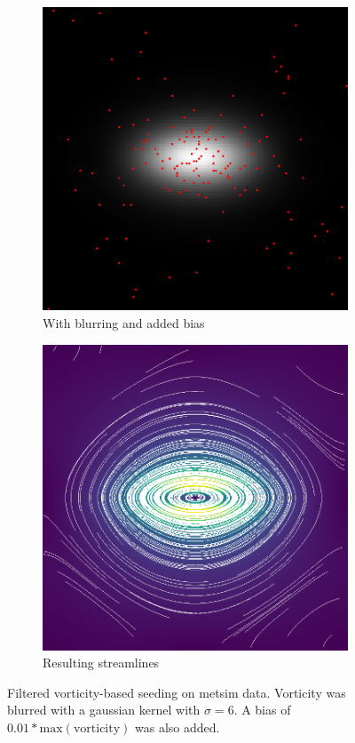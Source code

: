 \documentclass{article}
\begin{document}
\begin{figure}[h!]
    \centering
    \begin{subfigure}{0.43\textwidth}
        \centering
        \includegraphics[width=\textwidth]{metsim_vorticity_filtered_seeds.eps}
        \caption{With blurring and added bias} %
    \end{subfigure}
    \hfill
    \begin{subfigure}{0.43\textwidth}
        \centering
        \includegraphics[width=\textwidth]{metsim_vorticity_filtered.eps}
        \caption{Resulting streamlines}
    \end{subfigure}
    \caption{Filtered vorticity-based seeding on metsim data. Vorticity was blurred with a gaussian kernel with $\sigma = 6$. A bias of $0.01*\mathrm{max}(\mathrm{vorticity})$ was also added.}
\end{figure}
\end{document}
